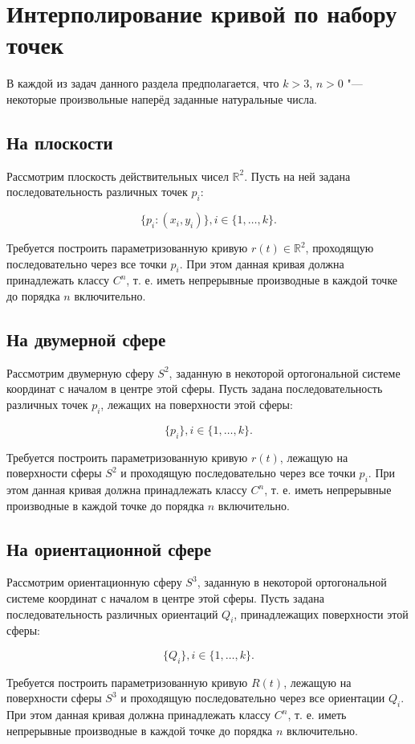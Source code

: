 \section{Интерполирование кривой по набору точек}

В каждой из задач данного раздела предполагается, что $k>3$, $n>0$ "--- некоторые произвольные наперёд заданные
натуральные числа.

\subsection*{На плоскости}

Рассмотрим плоскость действительных чисел $\mathbb{R}^2$. Пусть на ней задана последовательность различных точек $p_i$:

$$\{p_i: (x_i, y_i)\}, i \in \{1, \dots, k\}.$$

Требуется построить параметризованную кривую $r(t) \in \mathbb{R}^2$, проходящую последовательно через все точки
$p_i$. При этом данная кривая должна принадлежать классу $C^n$, т. е. иметь непрерывные производные в каждой точке до
порядка $n$ включительно.

\subsection*{На двумерной сфере}

Рассмотрим двумерную сферу $S^2$, заданную в некоторой ортогональной системе координат с началом в центре этой сферы.
Пусть задана последовательность различных точек $p_i$, лежащих на поверхности этой сферы:

$$\{p_i\}, i \in \{1, \dots, k\}.$$

Требуется построить параметризованную кривую $r(t)$, лежащую на поверхности сферы $S^2$ и проходящую последовательно
через все точки $p_i$. При этом данная кривая должна принадлежать классу $C^n$, т. е. иметь непрерывные производные в
каждой точке до порядка $n$ включительно.

\subsection*{На ориентационной сфере}

Рассмотрим ориентационную сферу $S^3$, заданную в некоторой ортогональной сис\-теме координат с началом в центре этой
сферы. Пусть задана последовательность различных ориентаций $Q_i$, принадлежащих поверхности этой сферы:

$$\{Q_i\}, i \in \{1, \dots, k\}.$$

Требуется построить параметризованную кривую $R(t)$, лежащую на поверхности сферы $S^3$ и проходящую
последовательно через все ориентации $Q_i$. При этом данная кривая должна принадлежать классу $C^n$, т. е. иметь
непрерывные производные в каждой точке до порядка $n$ включительно.
